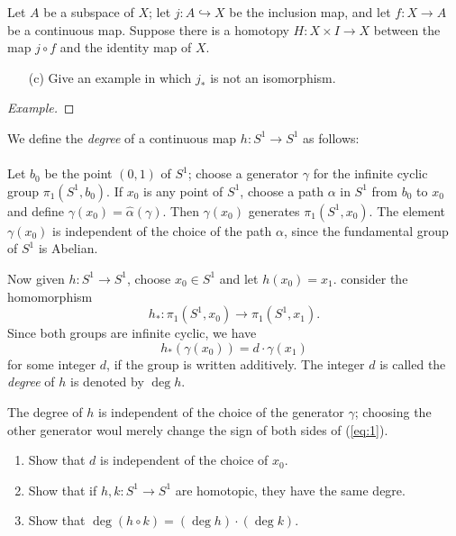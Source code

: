 \begin{problem}[Munkres \S58, Ex.\,7(c)]
Let $A$ be a subspace of $X$; let $j\colon A\hookrightarrow X$ be the
inclusion map, and let $f\colon X\to A$ be a continuous map. Suppose there
is a homotopy $H\colon X\times I\to X$ between the map $j\circ f$ and the
identity map of $X$.
\begin{itemize}
\item[(c)] Give an example in which $j_*$ is not an isomorphism.
\end{itemize}
\end{problem}
\begin{proof}[Example]
\renewcommand\qedsymbol{$\spadesuit$}
\end{proof}
\newpage
\begin{problem}[Munkres \S58, Ex.9(a,b,c)]
We define the \emph{degree} of a continuous map $h\colon S^1\to S^1$ as
follows:
\\\\
Let $b_0$ be the point $(0,1)$ of $S^1$; choose a generator $\gamma$ for
the infinite cyclic group $\pi_1(S^1,b_0)$. If $x_0$ is any point of $S^1$,
choose a path $\alpha$ in $S^1$ from $b_0$ to $x_0$ and define
$\gamma(x_0)=\hat\alpha(\gamma)$. Then $\gamma(x_0)$ generates
$\pi_1(S^1,x_0)$. The element $\gamma(x_0)$ is independent of the choice of
the path $\alpha$, since the fundamental group of $S^1$ is Abelian.

Now given $h\colon S^1\to S^1$, choose $x_0\in S^1$ and let
$h(x_0)=x_1$. consider the homomorphism
\[
h_*\colon\pi_1(S^1,x_0)\longrightarrow\pi_1(S^1,x_1).
\]
Since both groups are infinite cyclic, we have
\begin{equation}
\label{eq:1}
\tag{*}
h_*(\gamma(x_0))=d\cdot\gamma(x_1)
\end{equation}
for some integer $d$, if the group is written additively. The integer $d$
is called the \emph{degree} of $h$ is denoted by $\deg h$.

The degree of $h$ is independent of the choice of the generator $\gamma$;
choosing the other generator woul merely change the sign of both sides of
(\ref{eq:1}).
\begin{enumerate}[label=(\alph*)]
\item Show that $d$ is independent of the choice of $x_0$.
\item Show that if $h,k\colon S^1\to S^1$ are homotopic, they have the same
  degre.
\item Show that $\deg(h\circ k)=(\deg h)\cdot(\deg k)$.
\end{enumerate}
\end{problem}
